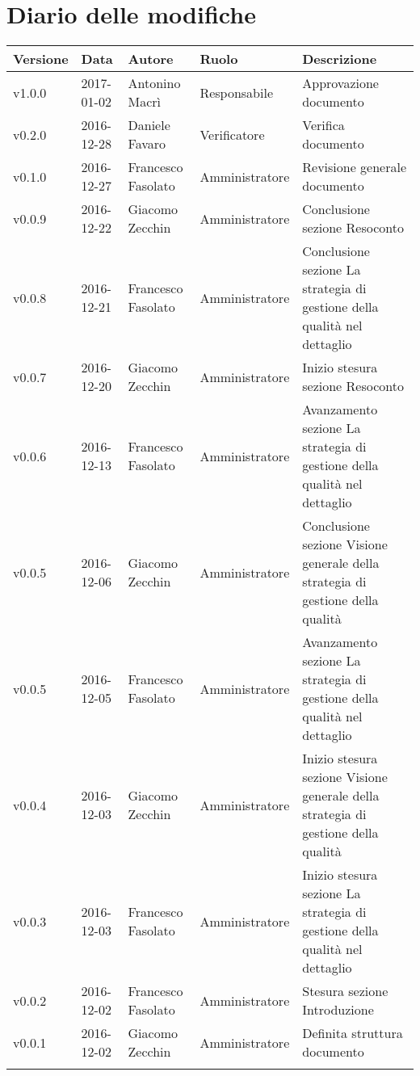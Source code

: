 \section*{Diario delle modifiche}
\begin{longtabu} to \textwidth {
	X[3,c,m] 
	X[4,c,m]
	X[4,c,m]
	X[5,c,m]
	X[10,c,m]}
	\toprule
	\textbf{Versione} & \textbf{Data}  & \textbf{Autore} & \textbf{Ruolo} & \textbf{Descrizione}\\
	\midrule
	\endhead
	
		v1.0.0 & 2017-01-02 & Antonino Macrì & Responsabile & Approvazione documento \\ 
		\addlinespace[0.3em]
		\midrule
		\addlinespace[0.3em]
		v0.2.0 & 2016-12-28 & Daniele Favaro & Verificatore & Verifica documento \\ 
		\addlinespace[0.3em]
		\midrule
		\addlinespace[0.3em]
		v0.1.0 & 2016-12-27 & Francesco Fasolato & Amministratore & Revisione generale documento \\ 
		\addlinespace[0.3em]
		\midrule
		\addlinespace[0.3em]
		v0.0.9 & 2016-12-22 & Giacomo Zecchin & Amministratore & Conclusione sezione Resoconto \\ 
		\addlinespace[0.3em]
		\midrule
		\addlinespace[0.3em]
		v0.0.8 & 2016-12-21 & Francesco Fasolato & Amministratore & Conclusione sezione La strategia di gestione della qualità nel dettaglio \\ 
		\addlinespace[0.3em]
		\midrule
		\addlinespace[0.3em]
		v0.0.7 & 2016-12-20 & Giacomo Zecchin & Amministratore & Inizio stesura sezione Resoconto \\ 
		\addlinespace[0.3em]
		\midrule
		\addlinespace[0.3em]
		v0.0.6 & 2016-12-13 & Francesco Fasolato & Amministratore & Avanzamento sezione La strategia di gestione della qualità nel dettaglio \\ 
		\addlinespace[0.3em]
		\midrule
		\addlinespace[0.3em]
		v0.0.5 & 2016-12-06 & Giacomo Zecchin & Amministratore & Conclusione sezione Visione generale della strategia di gestione della qualità \\ 
		\addlinespace[0.3em]
		\midrule
		\addlinespace[0.3em]
		v0.0.5 & 2016-12-05 & Francesco Fasolato & Amministratore & Avanzamento sezione La strategia di gestione della qualità nel dettaglio \\ 
		\addlinespace[0.3em]
		\midrule
		\addlinespace[0.3em]
		v0.0.4 & 2016-12-03 & Giacomo Zecchin & Amministratore & Inizio stesura sezione Visione generale della strategia di gestione della qualità \\ 
		\addlinespace[0.3em]
		\midrule
		\addlinespace[0.3em]
		v0.0.3 & 2016-12-03 & Francesco Fasolato & Amministratore & Inizio stesura sezione La strategia di gestione della qualità nel dettaglio \\ 
		\addlinespace[0.3em]
		\midrule
		\addlinespace[0.3em]
		v0.0.2 & 2016-12-02 & Francesco Fasolato & Amministratore & Stesura sezione Introduzione \\ 
		\addlinespace[0.3em]
		\midrule
		\addlinespace[0.3em]	
		v0.0.1 & 2016-12-02 & Giacomo Zecchin & Amministratore & Definita struttura documento \\


	
	\bottomrule
\end{longtabu}
